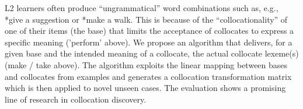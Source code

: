 L2 learners often produce ``ungrammatical'' word combinations such as, e.g., *give a suggestion or *make a walk. This is because of the ``collocationality'' of one of their items (the base) that limits the acceptance of collocates to express a specific meaning ('perform' above). We propose an algorithm that delivers, for a given base and the intended meaning of a collocate, the actual collocate lexeme(s) (make / take above). The algorithm exploits the linear mapping between bases and collocates from examples and generates a collocation transformation matrix which is then applied to novel unseen cases. The evaluation shows a promising line of research in collocation discovery.
